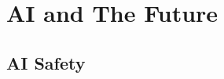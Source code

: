 \documentclass[../../main.tex]{subfiles}
\begin{document}
\chapter{AI and The Future}





\section{AI Safety}
\end{document}
